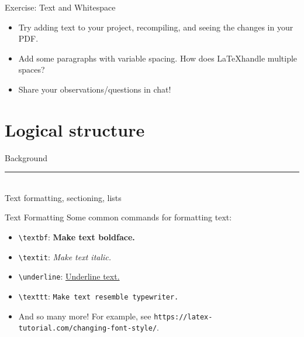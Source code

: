 \documentclass{beamer}
\begin{document}
{  \begin{frame}{Exercise: Text and Whitespace}
    \begin{itemize}
      \item Try adding text to your project, recompiling, and seeing the changes in your PDF.
      \item Add some paragraphs with variable spacing. How does \LaTeX handle multiple spaces?
      \item Share your observations/questions in chat!
    \end{itemize}
  \end{frame}

  \section{Logical structure}

  \begin{frame}[plain]
    \vfill
    \centering
    \begin{beamercolorbox}[sep=8pt,center,shadow=true,rounded=true]{Background}
      \insertsectionhead\par%
      \color{davisblue}\noindent\rule{10cm}{1pt} \\
      \footnotesize{Text formatting, sectioning, lists}
    \end{beamercolorbox}
    \vfill
  \end{frame}

  \begin{frame}{Text Formatting}
    Some common commands for formatting text:
    \begin{itemize}
      \item \texttt{\textbackslash textbf}: \textbf{Make text boldface.}
      \item \texttt{\textbackslash textit}: \textit{Make text italic.}
      \item \texttt{\textbackslash underline}: \underline{Underline text.}
      \item \texttt{\textbackslash texttt}: \texttt{Make text resemble typewriter.}
      \item And so many more! For example, see \texttt{https://latex-tutorial.com/changing-font-style/}.
    \end{itemize}
  \end{frame}

}
\end{document}
